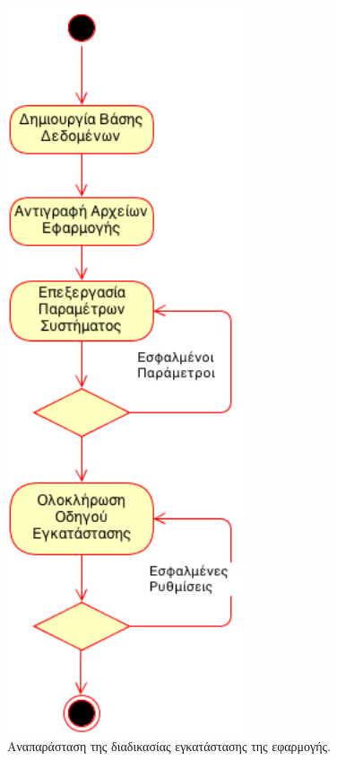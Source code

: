 \begin{figure}
\centering
\includegraphics[width=70mm]{images/ad-install-application.png}
\caption{Αναπαράσταση της διαδικασίας εγκατάστασης της εφαρμογής.}
\label{ad-install-application}
\end{figure}

